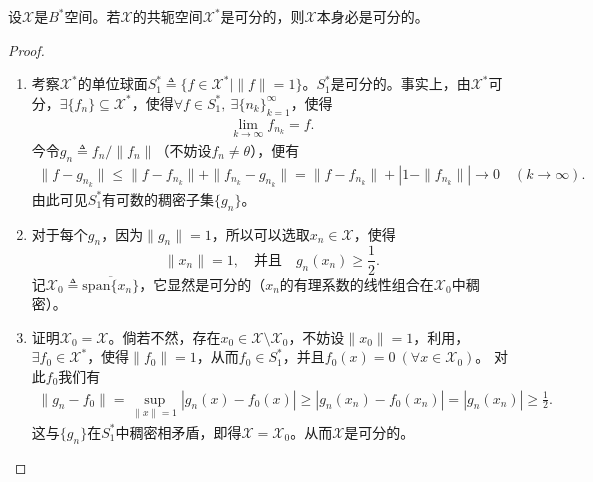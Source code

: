 \documentclass[../../main.tex]{subfiles}%
\begin{document}
\begin{theorem}[Banach定理]\label{theorem:泛函分析------Banach定理}
设$\mathscr{X}$是$B^*$空间。若$\mathscr{X}$的共轭空间$\mathscr{X}^*$是可分的，则$\mathscr{X}$本身必是可分的。
\end{theorem}
\begin{proof}
\begin{enumerate}[(1)]
\item 考察$\mathscr{X}^*$的单位球面$S_1^*\triangleq\{f\in\mathscr{X}^*|\|f\|=1\}$。$S_1^*$是可分的。事实上，由$\mathscr{X}^*$可分，$\exists\{f_n\}\subseteq\mathscr{X}^*$，使得$\forall f\in S_1^*,\ \exists\{n_k\}_{k=1}^{\infty}$，使得
\begin{align*}
\lim\limits_{k\to\infty}f_{n_k}=f.
\end{align*}
今令$g_n\triangleq f_n/\|f_n\|$（不妨设$f_n\neq\theta$），便有
\begin{align*}
\|f-g_{n_k}\|\leqslant\|f-f_{n_k}\|+\|f_{n_k}-g_{n_k}\|=\|f-f_{n_k}\|+|1-\|f_{n_k}\||\to0\quad(k\to\infty).
\end{align*}
由此可见$S_1^*$有可数的稠密子集$\{g_n\}$。

\item 对于每个$g_n$，因为$\|g_n\|=1$，所以可以选取$x_n\in\mathscr{X}$，使得
$$\|x_n\|=1,\quad\text{并且}\quad g_n(x_n)\geqslant\frac{1}{2}.$$
记$\mathscr{X}_0\triangleq\overline{\mathrm{span}\{x_n\}}$，它显然是可分的（$x_n$的有理系数的线性组合在$\mathscr{X}_0$中稠密）。

\item 证明$\mathscr{X}_0=\mathscr{X}$。倘若不然，存在$x_0\in\mathscr{X}\setminus\mathscr{X}_0$，不妨设$\|x_0\|=1$，利用，$\exists f_0\in\mathscr{X}^*$，使得$\|f_0\|=1$，从而$f_0\in S_1^*$，并且$f_0(x)=0\ (\forall x\in\mathscr{X}_0)$。
对此$f_0$我们有
\begin{align*}
\|g_n-f_0\|=\sup\limits_{\|x\|=1}|g_n(x)-f_0(x)|
\geqslant|g_n(x_n)-f_0(x_n)|=|g_n(x_n)|\geqslant\frac{1}{2}.
\end{align*}
这与$\{g_n\}$在$S_1^*$中稠密相矛盾，即得$\mathscr{X}=\mathscr{X}_0$。从而$\mathscr{X}$是可分的。
\end{enumerate}
\end{proof}
\end{document}

